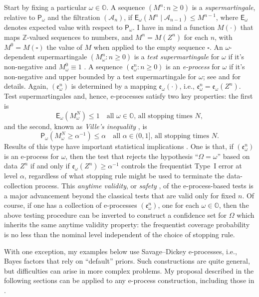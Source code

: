 \documentclass[a4paper, 12pt]{article}
\theoremstyle{plain}
\theoremstyle{definition}
\theoremstyle{remark}
\newcommand{\prob}{\mathsf{P}}
\newcommand{\E}{\mathsf{E}}
\newcommand{\A}{\mathcal{A}}
\newcommand{\OO}{\mathbb{O}}
\newcommand{\ZZ}{\mathbb{Z}}
\newcommand{\eval}{\mathfrak{e}}
\begin{document}
Start by fixing a particular $\omega \in \OO$.  A sequence $(M^n: n \geq 0)$ is a {\em supermartingale}, relative to $\prob_\omega$ and the filtration $(\A_n)$, if $\E_\omega(M^n \mid \A_{n-1}) \leq M^{n-1}$, where $\E_\omega$ denotes expected value with respect to $\prob_\omega$.  I have in mind a function $M(\cdot)$ that maps $\ZZ$-valued sequences to numbers, and $M^n = M(Z^n)$ for each $n$, with $M^0 = M(\square)$ the value of $M$ when applied to the empty sequence $\square$.  An $\omega$-dependent supermartingale $(M_\omega^n: n \geq 0)$ is a {\em test supermartingale} for $\omega$ if it's non-negative and $M_\omega^0 \equiv 1$ \citep[e.g.,][]{shafer.vovk.martingale}.  A sequence $(\eval_\omega^n: n \geq 0)$ is an {\em e-process} for $\omega$ if it's non-negative and upper bounded by a test supermartingale for $\omega$; see \citet{ramdas.nnm} and \citet{evalues.review} for details.  Again, $(\eval_\omega^n)$ is determined by a mapping $\eval_\omega(\cdot)$, i.e., $\eval_\omega^n = \eval_\omega(Z^n)$.  Test supermartingales and, hence, e-processes satisfy two key properties: the first \citep[e.g.,][Theorem~5.7.6]{durrett2010} is 
\[ \E_\omega ( M_\omega^N ) \leq 1 \quad \text{all $\omega \in \OO$, all stopping times $N$}, \]
and the second, known as {\em Ville's inequality} \citep[e.g.,][]{shafer.vovk.book.2019}, is
\[ \prob_\omega(M_\omega^N \geq \alpha^{-1}) \leq \alpha \quad \text{all $\alpha \in (0,1]$, all stopping times $N$}. \]
Results of this type have important statistical implications \citep[e.g.,][]{shafer.betting}.  One is that, if $(\eval_\omega^n)$ is an e-process for $\omega$, then the test that rejects the hypothesis ``$\Omega=\omega$'' based on data $Z^n$ if and only if $\eval_\omega(Z^n) \geq \alpha^{-1}$ controls the frequentist Type~I error at level $\alpha$, regardless of what stopping rule might be used to terminate the data-collection process.  This {\em anytime validity}, or {\em safety} \citep{grunwald.safetest}, of the e-process-based tests is a major advancement beyond the classical tests that are valid only for fixed $n$. Of course, if one has a collection of e-processes $(\eval_\omega^n)$, one for each $\omega \in \OO$, then the above testing procedure can be inverted to construct a confidence set for $\Omega$ which inherits the same anytime validity property: the frequentist coverage probability is no less than the nominal level independent of the choice of stopping rule. 

With one exception, my examples below use Savage--Dickey e-processes, i.e., Bayes factors that rely on ``default'' priors.  Such constructions are quite general, but difficulties can arise in more complex problems.  My proposal described in the following sections can be applied to any e-process construction, including those in \citet{evalues.review}.  
\end{document}
